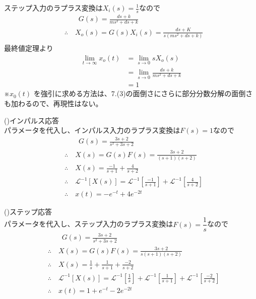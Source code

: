 \documentclass[a4paper,12pt]{article}
\begin{document}
\begin{tcolorbox}[title={5.(4)ステップ入力を印加した際の定常値を求めよ。
    }]
        ステップ入力のラプラス変換は\(X_i(s)=\frac{1}{s}\)なので
    \vspace{-2mm}
    \begin{align*}
        &\qquad G(s) = \frac{d s + k}{m s^2 + d s + k} \\
        &\therefore \quad X_o(s) = G(s) X_i(s) = \frac{d s + K}{s(m s^2 + d s + k)}\\
    \end{align*}
    最終値定理より
    \begin{align*}
    \lim_{t \to \infty} x_o(t) &= \lim_{s \to 0} sX_o(s) \\
        &= \lim_{s \to 0} \frac{d s + k}{m s^2 + d s + k} \\
        &= 1
    \end{align*}
※\(x_0(t)\) を強引に求める方法は、7.(3)の面倒さにさらに部分分数分解の面倒さも加わるので、再現性はない。
\end{tcolorbox}
\begin{tcolorbox}[title={5.(5)\quad \( m=1,d=3,k=2\)とし、インパルス応答、ステップ応答をそれぞれ求めよ。
    }]
    (\uppercase\expandafter{})インパルス応答 \\
    パラメータを代入し、インパルス入力のラプラス変換は\(F(s)=1\)なので
    \vspace{-2mm}
    \begin{align*}
        &\qquad G(s) = \frac{3 s + 2}{s^2 + 3 s + 2} \\
        &\therefore \quad X(s) = G(s) F(s) = \frac{3 s + 2}{(s+1)(s+2)} \\
        &\therefore \quad X(s) = \frac{-1}{s+1} + \frac{4}{s+2} \\
        &\therefore \quad \mathcal{L}^{-1} \left[ X(s)\right] 
        = \mathcal{L}^{-1} \left[\frac{-1}{s+1}\right] 
        + \mathcal{L}^{-1} \left[\frac{4}{s+2} \right] \\
        &\therefore \quad x(t) = -e^{-t} + 4 e^{-2t}
    \end{align*}

    (\uppercase\expandafter{})ステップ応答 \\
    パラメータを代入し、ステップ入力のラプラス変換は\(F(s)=\dfrac{1}{s}\)なので
    \vspace{-2mm}
    \begin{align*}
        &\qquad G(s) = \frac{3 s + 2}{s^2 + 3 s + 2} \\
        &\therefore \quad X(s) = G(s) F(s) = \frac{3 s + 2}{s(s+1)(s+2)} \\
        &\therefore \quad X(s) = \frac{1}{s}+\frac{1}{s+1} + \frac{-2}{s+2} \\
        &\therefore \quad \mathcal{L}^{-1} \left[ X(s)\right] 
        = \mathcal{L}^{-1} \left[\frac{1}{s}\right] 
        + \mathcal{L}^{-1} \left[\frac{1}{s+1} \right]
        + \mathcal{L}^{-1} \left[\frac{-2}{s+2} \right] \\
        &\therefore \quad x(t) = 1 + e^{-t} -2 e^{-2t}
    \end{align*}
\end{tcolorbox}
\end{document}
